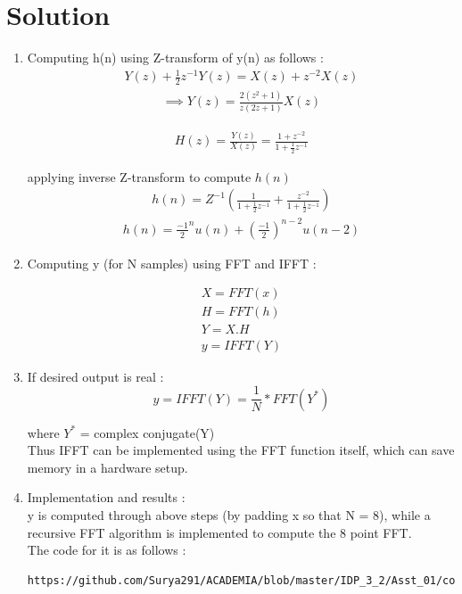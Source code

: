 \documentclass[journal,12pt,twocolumn]{IEEEtran}
\renewcommand\thesection{\arabic{section}}
\begin{document}
\section{Solution}
\begin{enumerate}[label=\thesection.\arabic*.,ref=\thesection.\theenumi]
\item
Computing h(n) using Z-transform of y(n) as follows : 
\begin{align}
    Y(z) + \frac{1}{2}z^{-1}Y(z)=X(z) + z^{-2}X(z)
\end{align}
\begin{align}
    \implies Y(z)=\frac{2(z^2+1)}{z(2z+1)}X(z)
\end{align}

\begin{align}
    H(z) = \frac{Y(z)}{X(z)} = \frac{1+z^{-2}}{1+\frac{1}{2}z^{-1}}
\end{align}

applying inverse Z-transform to compute $h(n)$
\begin{align}
 h(n)= Z^{-1}\left( {\frac{1}{1+\frac{1}{2}z^{-1}} + \frac{z^{-2}}{1+\frac{1}{2}z^{-1}}} \right)
\end{align}
\begin{align}
 h(n)={\frac{-1}{2}}^nu(n) + \left({\frac{-1}{2}}\right)^{n-2}u(n-2)
\end{align}

\item Computing y (for N samples) using FFT and IFFT : 

\begin{align}
X = FFT(x)\\
H = FFT(h)\\
Y = X.H\\
y = IFFT(Y)
\end{align}


\item If desired output is real : 
\begin{equation}
    y = IFFT(Y) = \frac{1}{N}*FFT(Y^{*})
\end{equation}

where $Y^{*}$ = complex conjugate(Y)\\
Thus IFFT can be implemented using the FFT function itself, which can save memory in a hardware setup.\\

\item Implementation and results : \\
y is computed through above steps (by padding x so that N = 8), while a recursive FFT algorithm is implemented to compute the 8 point FFT.\\
The code for it is as follows :
\begin{lstlisting}
https://github.com/Surya291/ACADEMIA/blob/master/IDP_3_2/Asst_01/codes/fft.py
\end{lstlisting}


\end{enumerate}
\end{document}
